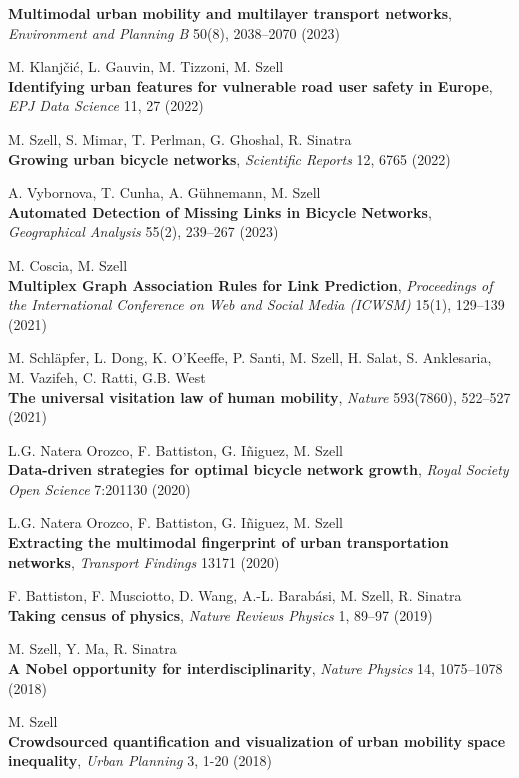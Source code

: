\documentclass[10pt,a4paper]{article}
\renewenvironment{itemize}{
  \begin{list}{}{
    \setlength{\leftmargin}{1.5em}
    \setlength{\itemsep}{0.25em}
    \setlength{\parskip}{0pt}
    \setlength{\parsep}{0.25em}
  }
}{
  \end{list}
}
\begin{document}
\begin{itemize}
    \textbf{Multimodal urban mobility and multilayer transport networks}, \textit{Environment and Planning B} 50(8), 2038--2070 (2023)
\item M. Klanjčić, L. Gauvin, M. Tizzoni, M. Szell\\
    \textbf{Identifying urban features for vulnerable road user safety in Europe}, \textit{EPJ Data Science} 11, 27 (2022)
\item M. Szell, S. Mimar, T. Perlman, G. Ghoshal, R. Sinatra\\
    \textbf{Growing urban bicycle networks}, \textit{Scientific Reports} 12, 6765 (2022)
\item A. Vybornova, T. Cunha, A. Gühnemann, M. Szell\\
    \textbf{Automated Detection of Missing Links in Bicycle Networks}, \textit{Geographical Analysis} 55(2), 239--267 (2023)
\item M. Coscia, M. Szell\\
    \textbf{Multiplex Graph Association Rules for Link Prediction}, \textit{Proceedings of the International Conference on Web and Social Media (ICWSM)} 15(1), 129--139 (2021)
\item M. Schläpfer, L. Dong, K. O'Keeffe, P. Santi, M. Szell, H. Salat, S. Anklesaria, M. Vazifeh, C. Ratti, G.B. West\\
    \textbf{The universal visitation law of human mobility}, \textit{Nature} 593(7860), 522--527 (2021)
\item L.G. Natera Orozco, F. Battiston, G. I{\~n}iguez, M. Szell\\
    \textbf{Data-driven strategies for optimal bicycle network growth}, \textit{Royal Society Open Science} 7:201130 (2020)
\item L.G. Natera Orozco, F. Battiston, G. Iñiguez, M. Szell\\
    \textbf{Extracting the multimodal fingerprint of urban transportation networks}, \textit{Transport Findings} 13171 (2020)
\item F. Battiston, F. Musciotto, D. Wang, A.-L. Barab\'asi, M. Szell, R. Sinatra\\
    \textbf{Taking census of physics}, \textit{Nature Reviews Physics} 1, 89--97 (2019)
\item M. Szell, Y. Ma, R. Sinatra\\
    \textbf{A Nobel opportunity for interdisciplinarity}, \textit{Nature Physics} 14, 1075--1078 (2018)
\item M. Szell\\
    \textbf{Crowdsourced quantification and visualization of urban mobility space inequality}, \textit{Urban Planning} 3, 1-20 (2018)

\end{itemize}
\end{document}
